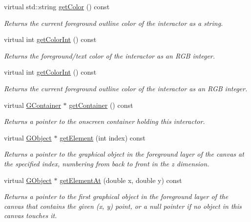 \begin{DoxyCompactItemize}
virtual std\+::string \mbox{\hyperlink{classGDrawingSurface_aa061dfa488c31e18549d64363c1d0e34}{get\+Color}} () const
\begin{DoxyCompactList}\small\item\em Returns the current foreground outline color of the interactor as a string. \end{DoxyCompactList}\item 
virtual int \mbox{\hyperlink{classGInteractor_a9635c7af766cdc3417f346683fa0e6c1}{get\+Color\+Int}} () const
\begin{DoxyCompactList}\small\item\em Returns the foreground/text color of the interactor as an R\+GB integer. \end{DoxyCompactList}\item 
virtual int \mbox{\hyperlink{classGDrawingSurface_a9635c7af766cdc3417f346683fa0e6c1}{get\+Color\+Int}} () const
\begin{DoxyCompactList}\small\item\em Returns the current foreground outline color of the interactor as an R\+GB integer. \end{DoxyCompactList}\item 
virtual \mbox{\hyperlink{classGContainer}{G\+Container}} $\ast$ \mbox{\hyperlink{classGInteractor_a7a6e317c29d61030929b4cd2d1c00fe7}{get\+Container}} () const
\begin{DoxyCompactList}\small\item\em Returns a pointer to the onscreen container holding this interactor. \end{DoxyCompactList}\item 
virtual \mbox{\hyperlink{classGObject}{G\+Object}} $\ast$ \mbox{\hyperlink{classGCanvas_abde388cc529d22bb5f7f4a54d56049d8}{get\+Element}} (int index) const
\begin{DoxyCompactList}\small\item\em Returns a pointer to the graphical object in the foreground layer of the canvas at the specified index, numbering from back to front in the {\itshape z} dimension. \end{DoxyCompactList}\item 
virtual \mbox{\hyperlink{classGObject}{G\+Object}} $\ast$ \mbox{\hyperlink{classGCanvas_a25efa999eca5790ec26ef091b05f961c}{get\+Element\+At}} (double x, double y) const
\begin{DoxyCompactList}\small\item\em Returns a pointer to the first graphical object in the foreground layer of the canvas that contains the given (x, y) point, or a null pointer if no object in this canvas touches it. \end{DoxyCompactList}\item 

\end{DoxyCompactItemize}
